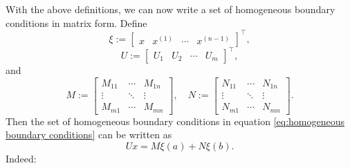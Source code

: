 \documentclass[11pt, oneside, a4paper]{article}
\begin{document}
With the above definitions, we can now write a set of homogeneous boundary conditions in matrix form. Define
\begin{equation}\label{eq:xi}
\xi := \begin{bmatrix}x & x^{(1)} & \cdots & x^{(n-1)}\end{bmatrix}^\intercal,
\end{equation}
\begin{equation}\label{eq:U}
U := \begin{bmatrix}U_1 & U_2 & \cdots & U_m\end{bmatrix}^\intercal,
\end{equation}
and 
\begin{equation}\label{eq:M, N}
    M := \begin{bmatrix}
        M_{11} & \cdots & M_{1n}\\
        \vdots & \ddots & \vdots\\
        M_{m1} & \cdots & M_{mn}
    \end{bmatrix},\quad
    N := \begin{bmatrix}
        N_{11} & \cdots & N_{1n}\\
        \vdots & \ddots & \vdots\\
        N_{m1} & \cdots & N_{mn}
    \end{bmatrix}.
\end{equation}
Then the set of homogeneous boundary conditions in equation \eqref{eq:homogeneous boundary conditions} can be written as
\begin{equation}\label{eq:Ux=Mxi(a)+Nxi(b)}
    Ux = M\xi(a) + N\xi(b).
\end{equation}
Indeed:
\end{document}
